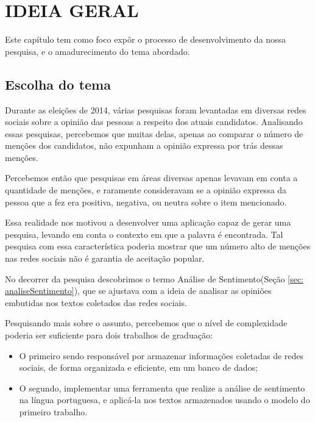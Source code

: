 \chapter{IDEIA GERAL}
\label{conceituacaoEIdeiaGeral} %
Este capítulo tem como foco expôr o processo de desenvolvimento da nossa pesquisa, e o amadurecimento do tema abordado.

\section{Escolha do tema}
\label{sec: escolhaDoTema}
Durante as eleições de 2014, várias pesquisas foram levantadas em diversas redes sociais sobre a opinião das pessoas a respeito dos atuais candidatos. Analisando essas pesquisas, percebemos que muitas delas, apenas ao comparar o número de menções dos candidatos, não expunham a opinião expressa por trás dessas menções.

Percebemos então que pesquisas em áreas diversas apenas levavam em conta a quantidade de menções, e raramente consideravam se a opinião expressa da pessoa que a fez era positiva, negativa, ou neutra sobre o item mencionado.

Essa realidade nos motivou a desenvolver uma aplicação capaz de gerar uma pesquisa, levando em conta o contexto em que a palavra é encontrada. Tal pesquisa com essa característica poderia mostrar que um número alto de menções nas redes sociais não é garantia de aceitação popular.

No decorrer da pesquisa descobrimos o termo Análise de Sentimento(Seção \ref{sec: analiseSentimento}), que se ajustava com a ideia de analisar as opiniões embutidas nos textos coletados das redes sociais.

Pesquisando mais sobre o assunto, percebemos que o nível de complexidade poderia ser suficiente para dois trabalhos de graduação:
\begin{itemize}
    \item O primeiro sendo responsável por armazenar informações coletadas de redes sociais, de forma organizada e eficiente, em um banco de dados;
    \item O segundo, implementar uma ferramenta que realize a análise de sentimento na língua portuguesa, e aplicá-la nos textos armazenados usando o modelo do primeiro trabalho.
\end{itemize}

